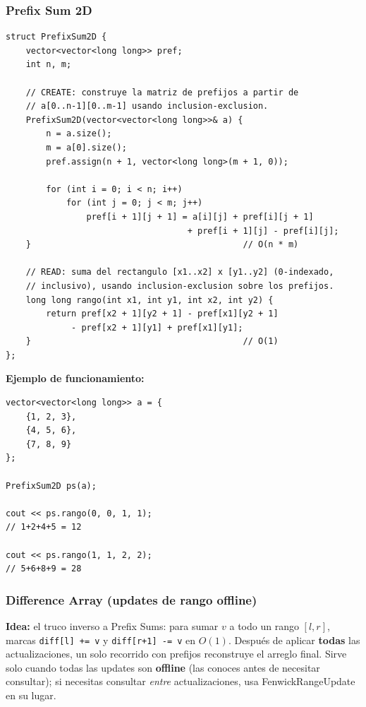 \documentclass[10pt,a4paper,twocolumn]{article}
\begin{document}
\subsubsection{Prefix Sum 2D}

\begin{lstlisting}[style=cpp]
struct PrefixSum2D {
    vector<vector<long long>> pref;
    int n, m;

    // CREATE: construye la matriz de prefijos a partir de
    // a[0..n-1][0..m-1] usando inclusion-exclusion.
    PrefixSum2D(vector<vector<long long>>& a) {
        n = a.size();
        m = a[0].size();
        pref.assign(n + 1, vector<long long>(m + 1, 0));

        for (int i = 0; i < n; i++)
            for (int j = 0; j < m; j++)
                pref[i + 1][j + 1] = a[i][j] + pref[i][j + 1]
                                    + pref[i + 1][j] - pref[i][j];
    }                                          // O(n * m)

    // READ: suma del rectangulo [x1..x2] x [y1..y2] (0-indexado,
    // inclusivo), usando inclusion-exclusion sobre los prefijos.
    long long rango(int x1, int y1, int x2, int y2) {
        return pref[x2 + 1][y2 + 1] - pref[x1][y2 + 1]
             - pref[x2 + 1][y1] + pref[x1][y1];
    }                                          // O(1)
};
\end{lstlisting}

\textbf{Ejemplo de funcionamiento:}

\begin{lstlisting}[style=cpp]
vector<vector<long long>> a = {
    {1, 2, 3},
    {4, 5, 6},
    {7, 8, 9}
};

PrefixSum2D ps(a);

cout << ps.rango(0, 0, 1, 1);
// 1+2+4+5 = 12

cout << ps.rango(1, 1, 2, 2);
// 5+6+8+9 = 28
\end{lstlisting}


\subsubsection{Difference Array (updates de rango offline)}

\textbf{Idea:} el truco inverso a Prefix Sums: para sumar $v$ a todo
un rango $[l,r]$, marcas \texttt{diff[l] += v} y \texttt{diff[r+1] -=
v} en $O(1)$. Después de aplicar \textbf{todas} las actualizaciones,
un solo recorrido con prefijos reconstruye el arreglo final. Sirve
solo cuando todas las updates son \textbf{offline} (las conoces antes
de necesitar consultar); si necesitas consultar \emph{entre}
actualizaciones, usa FenwickRangeUpdate en su lugar.
\end{document}
